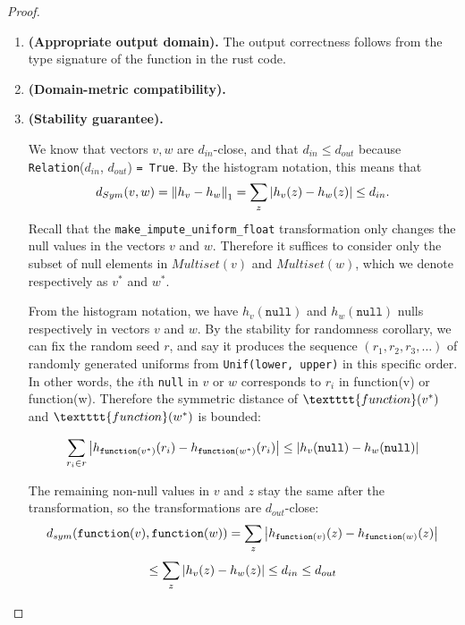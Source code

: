 \documentclass[11pt,a4paper]{article}
\begin{document}
\begin{proof}
\begin{enumerate}
    \item \textbf{(Appropriate output domain).} The output correctness follows from the type signature of the function in the rust code. 
    \item \textbf{(Domain-metric compatibility).}
    \item \textbf{(Stability guarantee).}
    
    We know that vectors $v, w$ are $d_{in}$-close, and that $d_{in} \leq d_{out}$ because \texttt{Relation}($d_{in}$, $d_{out}$) \texttt{= True}. By the histogram notation, this means that $$d_{Sym}(v, w) = \norm{h_v - h_w}_1 = \sum_{z} \abs{h_v(z) - h_w(z)} \leq d_{in}.$$ Recall that the \texttt{make\_impute\_uniform\_float} transformation only changes the null values in the vectors $v$ and $w$. Therefore it suffices to consider only the subset of null elements in $Multiset(v)$ and $Multiset(w)$, which we denote respectively as $v^*$ and $w^*$. 
    
    From the histogram notation, we have $h_v(\texttt{null})$ and $h_w(\texttt{null})$ nulls respectively in vectors $v$ and $w$. By the stability for randomness corollary, we can fix the random seed $r$, and say it produces the sequence $(r_1, r_2, r_3, \ldots)$ of randomly generated uniforms from \texttt{Unif(lower, upper)} in this specific order. In other words, the $i$th \texttt{null} in $v$ or $w$ corresponds to $r_i$ in function(v) or function(w). Therefore the symmetric distance of $\textttt{function}(v^*)$ and  $\textttt{function}(w^*)$ is bounded:
    
    
    $$\sum_{r_i \in r} \abs{h_{\texttt{function}(v^*)}(r_i) - h_{\texttt{function}(w^*)}(r_i)} \leq \abs{h_{v}(\texttt{null}) - h_{w}(\texttt{null})}$$
    
    The remaining non-null values in $v$ and $z$ stay the same after the transformation, so the transformations are $d_{out}$-close: $$d_{sym}(\texttt{function}(v), \texttt{function}(w)) = \sum_z \abs{h_{\texttt{function}(v)}(z) - h_{\texttt{function}(w)}(z)}$$
    $$\leq \sum_z \abs{h_v(z) - h_w(z)} \leq d_{in} \leq d_{out}$$ 
    
    


    
\end{enumerate}
\end{proof}

\newpage
\end{document}
